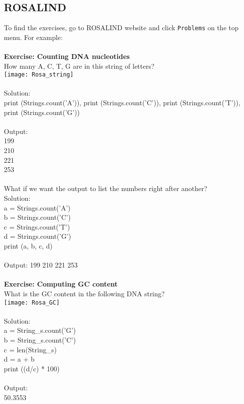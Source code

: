 \documentclass{article}
\begin{document}
{{{\subsection{ROSALIND}
To find the exercises, go to ROSALIND website and click \texttt{Problems} on the top menu. For example:\\
\\
\textbf{Exercise: Counting DNA nucleotides} \\
How many A, C, T, G are in this string of letters?\\
\texttt{[image: Rosa\_string]}\\
\\
Solution:\\
print (Strings.count('A')), print (Strings.count('C')), print (Strings.count('T')), print (Strings.count('G'))\\
\\
Output:\\
199\\
210\\
221\\
253\\
\\
What if we want the output to list the numbers right after another?\\
Solution: \\
a = Strings.count('A')\\
b = Strings.count('C')\\
c = Strings.count('T')\\
d = Strings.count('G')\\
print (a, b, c, d)\\
\\
Output: 199 210 221 253\\
\\
\textbf{Exercise: Computing GC content}\\
What is the GC content in the following DNA string?\\
\texttt{[image: Rosa\_GC]}\\
\\
Solution:\\
a = String\_s.count('G')\\
b = String\_s.count('C')\\
c = len(String\_s)\\
d = a + b\\
print ((d/c) * 100)\\
\\
Output:\\
50.3553\\

}}}
\end{document}

